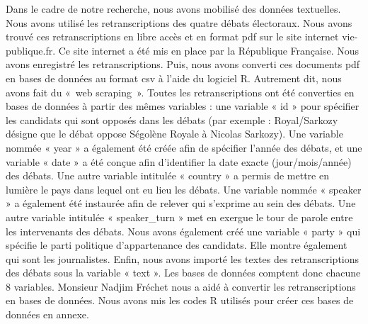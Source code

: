 \documentclass[
  letterpaper,
  DIV=11,
  numbers=noendperiod]{scrartcl}
\begin{document}
Dans le cadre de notre recherche, nous avons mobilisé des données
textuelles. Nous avons utilisé les retranscriptions des quatre débats
électoraux. Nous avons trouvé ces retranscriptions en libre accès et en
format pdf sur le site internet vie-publique.fr. Ce site internet a été
mis en place par la République Française. Nous avons enregistré les
retranscriptions. Puis, nous avons converti ces documents pdf en bases
de données au format csv à l'aide du logiciel R. Autrement dit, nous
avons fait du «~web scraping~». Toutes les retranscriptions ont été
converties en bases de données à partir des mêmes variables : une
variable « id » pour spécifier les candidats qui sont opposés dans les
débats (par exemple : Royal/Sarkozy désigne que le débat oppose Ségolène
Royale à Nicolas Sarkozy). Une variable nommée « year » a également été
créée afin de spécifier l'année des débats, et une variable « date » a
été conçue afin d'identifier la date exacte (jour/mois/année) des
débats. Une autre variable intitulée « country » a permis de mettre en
lumière le pays dans lequel ont eu lieu les débats. Une variable nommée
« speaker » a également été instaurée afin de relever qui s'exprime au
sein des débats. Une autre variable intitulée « speaker\_turn » met en
exergue le tour de parole entre les intervenants des débats. Nous avons
également créé une variable « party » qui spécifie le parti politique
d'appartenance des candidats. Elle montre également qui sont les
journalistes. Enfin, nous avons importé les textes des retranscriptions
des débats sous la variable « text ». Les bases de données comptent donc
chacune 8 variables. Monsieur Nadjim Fréchet nous a aidé à convertir les
retranscriptions en bases de données. Nous avons mis les codes R
utilisés pour créer ces bases de données en annexe.
\end{document}
